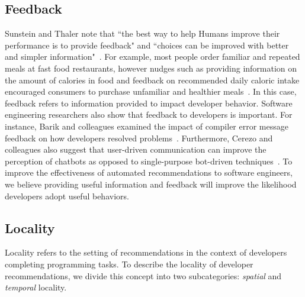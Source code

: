 \subsection{Feedback} Sunstein and Thaler note that ``the best way to help Humans improve their performance is to provide feedback" and ``choices can be improved with better and simpler information"~\cite[p.~92,~204]{sunstein2008nudge}. For example, most people order familiar and repeated meals at fast food restaurants, however nudges such as providing information on the amount of calories in food and feedback on recommended daily caloric intake encouraged consumers to purchase unfamiliar and healthier meals~\cite{Wisdom2010Healthy}. In this case, feedback refers to information provided to impact developer behavior.
Software engineering researchers also show that feedback to developers is important. For instance, Barik and colleagues examined the impact of compiler error message feedback on how developers resolved problems~\cite{barik2018should}. Furthermore, Cerezo and colleagues also suggest that user-driven communication can improve the perception of chatbots as opposed to single-purpose bot-driven techniques~\cite{cerezo2019building}. To improve the effectiveness of automated recommendations to software engineers, we believe providing useful information and feedback will improve the likelihood developers adopt useful behaviors.

\subsection{Locality} Locality refers to the setting of recommendations in the context of developers completing programming tasks. To describe the locality of developer recommendations, we divide this concept into two subcategories: \textit{spatial} and \textit{temporal} locality.

